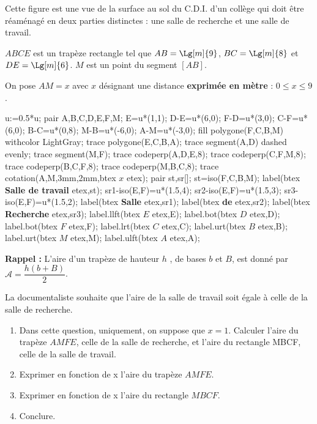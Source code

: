 \begin{exercice*}
    Cette figure est une vue de la surface au sol du C.D.I. d'un collège qui doit être réaménagé
    en deux parties distinctes : une salle de recherche et une salle de travail.

    $ABCE$ est un trapèze rectangle tel que $AB=\Lg[m]{9}$, $BC=\Lg[m]{8}$ et $DE=\Lg[m]{6}$.
    $M$ est un point du segment $[AB]$. 
    
    On pose $AM=x$ avec $x$ désignant une distance \textbf{exprimée en mètre} : $0\leq x \leq 9$.

    \begin{Geometrie}[CoinHD={(17u,10u)}]
        u:=0.5*u;
        pair A,B,C,D,E,F,M;
        E=u*(1,1);
        D-E=u*(6,0);
        F-D=u*(3,0);
        C-F=u*(6,0);
        B-C=u*(0,8);
        M-B=u*(-6,0);
        A-M=u*(-3,0);
        fill polygone(F,C,B,M) withcolor LightGray;
        trace polygone(E,C,B,A);
        trace segment(A,D) dashed evenly;
        trace segment(M,F);
        trace codeperp(A,D,E,8);
        trace codeperp(C,F,M,8);
        trace codeperp(B,C,F,8);
        trace codeperp(M,B,C,8);
        trace cotation(A,M,3mm,2mm,btex $x$ etex);
        pair st,sr[];
        st=iso(F,C,B,M);
        label(btex \textbf{Salle de travail} etex,st);
        sr1-iso(E,F)=u*(1.5,4);
        sr2-iso(E,F)=u*(1.5,3);
        sr3-iso(E,F)=u*(1.5,2);
        label(btex \textbf{Salle} etex,sr1);
        label(btex \textbf{de} etex,sr2);
        label(btex \textbf{Recherche} etex,sr3);
        label.llft(btex $E$ etex,E);
        label.bot(btex  $D$ etex,D);
        label.bot(btex  $F$ etex,F);
        label.lrt(btex  $C$ etex,C);
        label.urt(btex  $B$ etex,B);
        label.urt(btex  $M$ etex,M);
        label.ulft(btex $A$ etex,A);
    \end{Geometrie}

    \textbf{Rappel :} L'aire d'un trapèze de hauteur $h$ , de bases $b$ et $B$, est donné par $\mathcal{A}=\dfrac{h(b+B)}{2}$.

    La documentaliste souhaite que l'aire de la salle de travail soit égale à celle de la salle de recherche.
    \begin{enumerate}
        \item Dans cette question, uniquement, on suppose que $x=1$. Calculer l'aire du trapèze $AMFE$, celle de la salle de
        recherche, et l'aire du rectangle MBCF, celle de la salle de travail.
        \item Exprimer en fonction de x l'aire du trapèze $AMFE$.
        \item Exprimer en fonction de x l'aire du rectangle $MBCF$.
        \item Conclure.
    \end{enumerate}
\end{exercice*}
